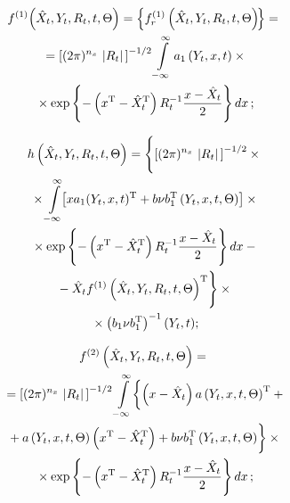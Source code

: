 \begin{multicols}{2}
   \vspace*{-12pt}
    
    \noindent
    \begin{multline}
    f^{(1)}\!\left(\hat X_t, Y_t,R_t,t, \Theta\right)=\left\{ f_r^{(1)} \left( \hat X_t, Y_t, R_t, t, 
    \Theta\right)\!\right\}={}\\
{}=\left[ (2\pi)^{n_x}\,\left\vert
    R_t\right\vert\,\right]^{-1/2}\int\limits_{-\infty}^\infty a_1\left(Y_t,x,t\right) \times{}\\
    {}\times \exp \left\{
    -\left(x^{\mathrm{T}} -\hat X_t^{\mathrm{T}}\right) R_t^{-1} \displaystyle\frac{\displaystyle x -\hat X_t\mathstrut}{\displaystyle 2\mathstrut}\right\}
    dx\,;\label{e3.4-s}
    \end{multline}
    
    \vspace*{-12pt}
    
    \noindent
    \begin{multline}
h\left(\hat X_t, Y_t,R_t,t, \Theta\right)=
\Biggl\{ \left[ (2\pi)^{n_x}\,\left\vert
    R_t\right\vert\,\right]^{-1/2}\times{}\\
    {}\times\int\limits_{-\infty}^\infty\!\!
    \left[ x a_1(Y_t,x,t)^{\mathrm{T}} + b\nu b_1^{\mathrm{T}} \left(Y_t,x,t, \Theta\right)\right]\times{}\\
{}\times \exp \left\{ -\left(x^{\mathrm{T}} -\hat X_t^{\mathrm{T}}\right) R_t^{-1} \displaystyle\frac{\displaystyle x -\hat X_t\mathstrut}{\displaystyle 2\mathstrut}\right\} dx-{}\\
{}-
    \hat X_t f^{(1)}\left(\hat X_t, Y_t,R_t,t, \Theta\right)^{\mathrm{T}}\Biggr\}\times{}\\
{}\times \left(b_1\nu b_1^{\mathrm{T}}\right)^{-1} (Y_t,t);
\label{e3.5-s}
\end{multline}

\vspace*{-12pt}
    
    \noindent
    \begin{multline}
f^{(2)}\left(\hat X_t, Y_t,R_t,t, \Theta\right)={}\\
{}=\left[ (2\pi)^{n_x}\,\left\vert
    R_t\right\vert\,\right]^{-1/2}\int\limits_{-\infty}^\infty
    \biggl\{  \left(x-\hat X_t\right) a\left(Y_t,x,t, \Theta\right)^{\mathrm{T}} + {}\\
{}+ a \left(Y_t,x,t, \Theta\right) \left(x^{\mathrm{T}}-\hat X_t^{\mathrm{T}}\right) +b\nu b_1^{\mathrm{T}} 
\left(Y_t,x,t, \Theta\right)\biggr\}\times{}\\
{}\times \exp \left\{ -\left(x^{\mathrm{T}} -\hat X_t^{\mathrm{T}}\right) R_t^{-1} \displaystyle\frac{\displaystyle x -\hat X_t\mathstrut}{\displaystyle 2\mathstrut}\right\}
    dx\,;\label{e3.6-s}
    \end{multline}
    
 \vspace*{-12pt}
    

\end{multicols}

